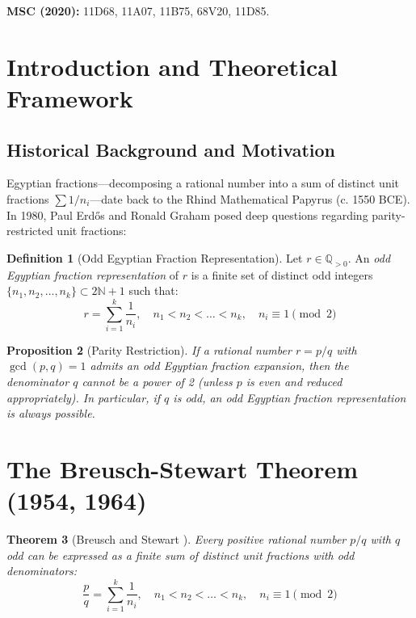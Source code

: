 \documentclass[11pt,a4paper]{article}
\newtheorem{theorem}{Theorem}[section]
\newtheorem{proposition}[theorem]{Proposition}
\theoremstyle{definition}
\newtheorem{definition}[theorem]{Definition}
\begin{document}
\noindent\textbf{MSC (2020):} 11D68, 11A07, 11B75, 68V20, 11D85.

\tableofcontents
\newpage

\section{Introduction and Theoretical Framework}

\subsection{Historical Background and Motivation}
Egyptian fractions—decomposing a rational number into a sum of distinct unit fractions $\sum 1/n_i$—date back to the Rhind Mathematical Papyrus (c. 1550 BCE).
In 1980, Paul Erd\H{o}s and Ronald Graham \cite{erdos_graham1980} posed deep questions regarding parity-restricted unit fractions:

\begin{definition}[Odd Egyptian Fraction Representation]\label{def:odd_egyptian}
Let $r \in \mathbb{Q}_{> 0}$. An \emph{odd Egyptian fraction representation} of $r$ is a finite set of distinct odd integers $\{n_1, n_2, \dots, n_k\} \subset 2\mathbb{N} + 1$ such that:
\begin{equation}\label{eq:odd_egyptian_sum}
r = \sum_{i=1}^k \frac{1}{n_i}, \quad n_1 < n_2 < \dots < n_k, \quad n_i \equiv 1 \pmod 2
\end{equation}
\end{definition}

\begin{proposition}[Parity Restriction]\label{prop:parity_restriction}
If a rational number $r = p/q$ with $\gcd(p, q) = 1$ admits an odd Egyptian fraction expansion, then the denominator $q$ cannot be a power of 2 (unless $p$ is even and reduced appropriately).
In particular, if $q$ is odd, an odd Egyptian fraction representation is always possible.
\end{proposition}

\section{The Breusch-Stewart Theorem (1954, 1964)}

\begin{theorem}[Breusch \cite{breusch1954} and Stewart \cite{stewart1964}]\label{thm:breusch_stewart}
Every positive rational number $p/q$ with $q$ odd can be expressed as a finite sum of distinct unit fractions with odd denominators:
\begin{equation}\label{eq:breusch_expansion}
\frac{p}{q} = \sum_{i=1}^k \frac{1}{n_i}, \quad n_1 < n_2 < \dots < n_k, \quad n_i \equiv 1 \pmod 2
\end{equation}
\end{theorem}
\end{document}
